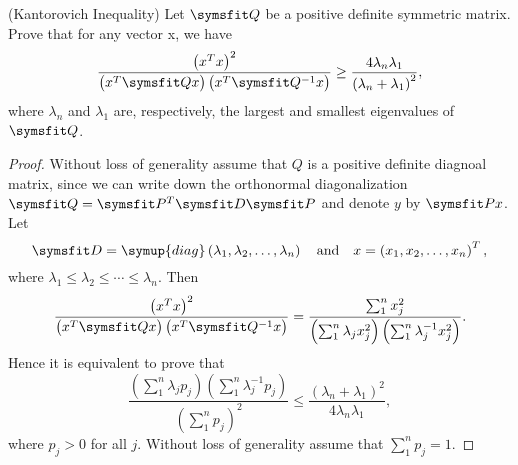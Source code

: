 \documentclass{assignment}[2019/09/15]
\newcommand{\diag}{\mathop{}\!\symup{diag}}
\begin{document}
    \begin{problem}(Kantorovich Inequality)
        Let $\matr{Q}$ be a positive definite symmetric matrix. Prove that for any vector x, we have
        \begin{equation}
            \frac{\left(x^Tx\right)^2}{\left(x^T\matr{Q}x\right)\left(x^T\matr{Q}^{-1}x\right)}\geq\frac{4\lambda_n\lambda_1}{\left(\lambda_n+\lambda_1\right)^2},
        \end{equation}
        where $\lambda_n$ and $\lambda_1$ are, respectively, the largest and smallest eigenvalues of $\matr{Q}$.
    \end{problem}
    \begin{proof}
        Without loss of generality assume that $Q$ is a positive definite diagnoal matrix, since we can write down the orthonormal diagonalization $\matr{Q}=\matr{P}^T\matr{D}\matr{P}$ and denote $y$ by $\matr{P}x$. Let
        \begin{equation}
            \matr{D}=\diag\left(\lambda_1, \lambda_2, \dotsc, \lambda_n\right)\quad\text{and}\quad x=\left(x_1, x_2,\dotsc, x_n\right)^T,
        \end{equation}
        where $\lambda_1\leq\lambda_2\leq\dotsb\leq\lambda_n$.
        Then
        \begin{equation}
            \frac{\left(x^Tx\right)^2}{\left(x^T\matr{Q}x\right)\left(x^T\matr{Q}^{-1}x\right)}
            =\frac{\sum_{1}^{n}x_j^2}{\left(\sum_1^n\lambda_jx_j^2\right)\left(\sum_1^n\lambda_j^{-1}x_j^2\right)}.
        \end{equation}
        Hence it is equivalent to prove that
        \begin{equation}\label{eq:5proof}
            \frac{\left(\sum_1^n\lambda_jp_j\right)\left(\sum_1^n\lambda_j^{-1}p_j\right)}{\left(\sum_{1}^{n}p_j\right)^2}\leq\frac{\left(\lambda_n+\lambda_1\right)^2}{4\lambda_n\lambda_1},
        \end{equation}
        where $p_j>0$ for all $j$. Without loss of generality assume that $\sum_1^np_j=1$.


\end{proof}
\end{document}
